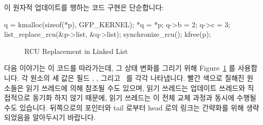 이 원자적 업데이트를 행하는 코드 구현은 단순합니다:

\begin{fcvlabel}
\begin{VerbatimN}[samepage=true,commandchars=\\\[\],firstnumber=15]
q = kmalloc(sizeof(*p), GFP_KERNEL);	\lnlbl[kmalloc]
*q = *p;				\lnlbl[copy]
q->b = 2;				\lnlbl[update1]
q->c = 3;				\lnlbl[update2]
list_replace_rcu(&p->list, &q->list);	\lnlbl[replace]
synchronize_rcu();			
kfree(p);				\lnlbl[kfree]
\end{VerbatimN}
\end{fcvlabel}

\begin{figure}[tbp]
\centering
{}
\caption{RCU Replacement in Linked List}
\label{fig:defer:RCU Replacement in Linked List}
\end{figure}

다음 이야기는 이 코드를 따라가는데, 그 상태 변화를 그리기 위해
Figure~\ref{fig:defer:RCU Replacement in Linked List} 를 사용합니다.
각 원소의 세 값은 필드 , , 그리고~ 를 각각 나타냅니다.
빨간 색으로 칠해진 원소들은 읽기 쓰레드에 의해 참조될 수도 있으며, 읽기
쓰레드는 업데이트 쓰레드와 직접적으로 동기화 하지 않기 때문에, 읽기 쓰레드는 이
전체 교체 과정과 동시에 수행될 수도 있습니다.
뒤쪽으로의 포인터와 tail 로부터 head 로의 링크는 간략화를 위해 생략되었음을
알아두시기 바랍니다.

